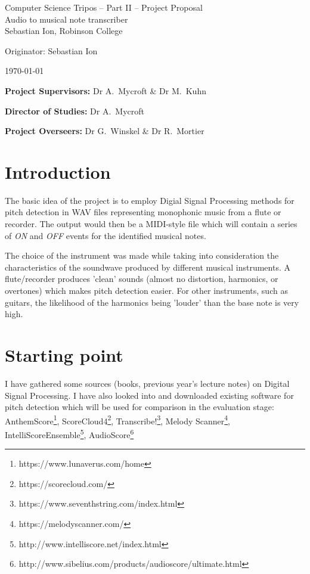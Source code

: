 \documentclass[12pt,a4paper,twoside]{article}
\begin{document}
\begin{center}
\Large
Computer Science Tripos -- Part II -- Project Proposal\\[4mm]
\LARGE
Audio to musical note transcriber\\[4mm]

\large
Sebastian Ion, Robinson College

Originator: Sebastian Ion

\today
\end{center}

\vspace{5mm}

\textbf{Project Supervisors:} Dr A.~Mycroft \& Dr M.~Kuhn

\textbf{Director of Studies:} Dr A.~Mycroft

\textbf{Project Overseers:} Dr G.~Winskel \& Dr R.~Mortier


\section*{Introduction}

The basic idea of the project is to employ Digial Signal Processing methods for pitch detection in WAV files representing monophonic music from a flute or recorder.
The output would then be a MIDI-style file which will contain a series of \emph{ON} and \emph{OFF} events for the identified musical notes.
\par
The choice of the instrument was made while taking into consideration the characteristics of the soundwave produced by different musical instruments. A flute/recorder produces 'clean' sounds (almost no distortion, harmonics, or overtones) which makes pitch detection easier.
For other instruments, such as guitars, the likelihood of the harmonics being 'louder' than the base note is very high.


\section*{Starting point}
I have gathered some sources (books, previous year's lecture notes) on Digital Signal Processing.
I have also looked into and downloaded existing software for pitch detection which will be used for comparison in the evaluation stage:
AnthemScore\footnote{https://www.lunaverus.com/home},
ScoreCloud4\footnote{https://scorecloud.com/},
Transcribe!\footnote{https://www.seventhstring.com/index.html},
Melody Scanner\footnote{https://melodyscanner.com/},
IntelliScoreEnsemble\footnote{http://www.intelliscore.net/index.html},
AudioScore\footnote{http://www.sibelius.com/products/audioscore/ultimate.html}
\end{document}

